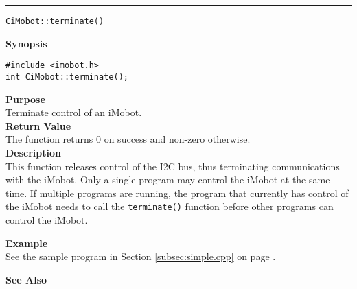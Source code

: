 \noindent
\vspace{5pt}
\rule{6.5in}{0.015in}
\noindent
{\LARGE \texttt{CiMobot::terminate()}}\\
{}

\noindent
{\bf Synopsis}\\
\begin{verbatim}
#include <imobot.h>
int CiMobot::terminate();
\end{verbatim}

\noindent
{\bf Purpose}\\
Terminate control of an iMobot.\\

\noindent
{\bf Return Value}\\
The function returns 0 on success and non-zero otherwise.\\

\noindent
{\bf Description}\\
This function releases control of the I2C bus, thus terminating communications
with the iMobot. Only a single program may control the iMobot at the same time. If multiple programs are running, the program that currently has control of the iMobot needs to call the \texttt{terminate()} function before other programs can control the iMobot.

\noindent
{\bf Example}\\
See the sample program in Section \ref{subsec:simple.cpp} on page \pageref{subsec:simple.cpp}.
\noindent

\noindent
{\bf See Also}\\

